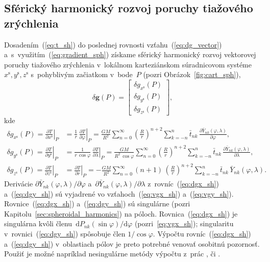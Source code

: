 \documentclass[a4paper, 12pt]{book}
\newcommand{\diff}{\mathrm d}
\let\vec\mathbf
\begin{document}
\subsection{Sférický harmonický rozvoj poruchy tiažového zrýchlenia}

Dosadením~(\ref{eq:t_sh}) do poslednej rovnosti vzťahu~(\ref{eq:dg_vector}) 
a~s~využitím~(\ref{eq:gradient_sph}) získame sférický harmonický rozvoj 
vektorovej poruchy tiažového zrýchlenia v~lokálnom karteziánskom súradnicovom 
systéme~$x^\mathrm{s}, y^\mathrm{s}, z^\mathrm{s}$ s~pohyblivým začiatkom 
v~bode~$P$ (pozri Obrázok~\ref{fig:cart_sph}),
%
\begin{equation}
\label{eq:dg_vec_sph}
\delta \vec g(P) =
%
\begin{bmatrix}
\delta g_{x^\mathrm{s}}(P)\\
\delta g_{y^\mathrm{s}}(P)\\
\delta g_{z^\mathrm{s}}(P)
\end{bmatrix}
%
{,}
\end{equation}
%
kde
%
\begin{align}
\label{eq:dgx_sh}
\delta g_{x^\mathrm{s}}(P) = \left.\frac{\partial T}{\partial 
x^\mathrm{s}}\right|_P &= \frac{1}{r} \, \left.\frac{\partial T}{\partial 
\varphi}\right|_P = \frac{GM}{R^2} \sum_{n = 0}^\infty \left( \frac{R}{r} 
\right)^{n + 2} \sum_{k = -n}^{n} \bar{t}_{nk} \, \frac{\partial 
\bar{Y}_{nk}(\varphi, \lambda)}{\partial \varphi}{,}\\
%
\label{eq:dgy_sh}
\delta g_{y^\mathrm{s}}(P) = \left.\frac{\partial T}{\partial 
y^\mathrm{s}}\right|_P &= \frac{1}{r \, \cos\varphi} \, \left.\frac{\partial 
T}{\partial \lambda}\right|_P = \frac{GM}{R^2 \, \cos\varphi} \sum_{n 
= 0}^\infty \left( \frac{R}{r} \right)^{n + 2} \sum_{k = -n}^{n}\bar{t}_{nk} \, 
\frac{\partial \bar{Y}_{nk}(\varphi, \lambda)}{\partial \lambda}{,}\\
%
\label{eq:dgz_sh}
\delta g_{z^\mathrm{s}}(P) = \left.\frac{\partial T}{\partial 
z^\mathrm{s}}\right|_P &= \left.\frac{\partial T}{\partial r}\right|_P 
= - \frac{GM}{R^2} \sum_{n = 0}^\infty (n + 1) \, \left( \frac{R}{r} \right)^{n 
+ 2} \sum_{k = -n}^{n} \bar{t}_{nk} \, \bar{Y}_{nk}(\varphi, \lambda){.}
\end{align}
%
Derivácie $\partial \bar{Y}_{nk}(\varphi, \lambda) \slash \partial \varphi$ 
a~$\partial \bar{Y}_{nk}(\varphi, \lambda) \slash \partial \lambda$ 
z~rovníc~(\ref{eq:dgx_sh}) a~(\ref{eq:dgy_sh}) sú vyjadrené vo 
vzťahoch~(\ref{eq:vgx_sh}) a~(\ref{eq:vgy_sh}).  Rovnice~(\ref{eq:dgx_sh}) 
a~(\ref{eq:dgy_sh}) sú singulárne (pozri 
Kapitolu~\ref{sec:spheroidal_harmonics}) na póloch.  Rovnica~(\ref{eq:dgx_sh}) 
je singulárna kvôli členu~$\diff P_{nk}(\sin\varphi) \slash \diff \varphi$ 
(pozri~\ref{eq:vgx_sh}); singularitu v~rovnici~(\ref{eq:dgy_sh}) spôsobuje člen 
$1 \slash \cos\varphi$.  Výpočtu rovníc~(\ref{eq:dgx_sh}) a~(\ref{eq:dgy_sh}) 
v~oblastiach pólov je preto potrebné venovať osobitnú pozornosť.  Použiť je 
možné napríklad nesingulárne metódy výpočtu z~prác \textcite{Petrovskaya2012}, 
\textcite{Sebera2013} či \textcite{Ivanov2018}.
\end{document}
